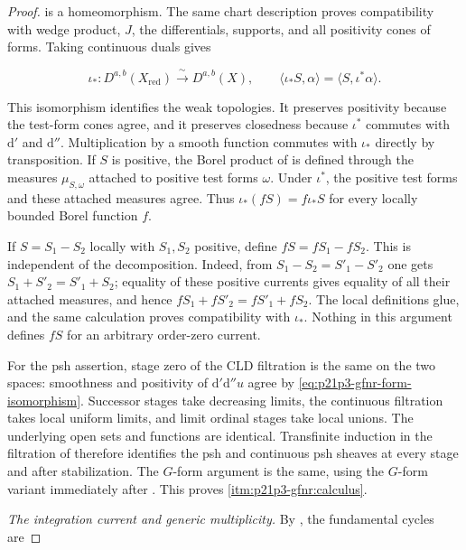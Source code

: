 \begin{proof}
is a homeomorphism.  The same chart description proves compatibility with
wedge product, \(J\), the differentials, supports, and all positivity cones
of forms.  Taking continuous duals gives

\begin{equation}
\label{eq:p21p3-gfnr-current-isomorphism}
 \iota_*:D^{a,b}(X_{\mathrm{red}})
              \xrightarrow{\ \sim\ }D^{a,b}(X),
 \qquad
 \langle\iota_*S,\alpha\rangle
       =\langle S,\iota^*\alpha\rangle .
\end{equation}

This isomorphism identifies the weak topologies.  It preserves positivity
because the test-form cones agree, and it preserves closedness because
\(\iota^*\) commutes with \(\mathrm d'\) and \(\mathrm d''\).
Multiplication by a smooth function commutes with \(\iota_*\) directly by
transposition.  If \(S\) is positive, the Borel product of
\cite[Example~7.2.12]{CLD25} is defined through the measures
\(\mu_{S,\omega}\) attached to positive test forms \(\omega\).  Under
\(\iota^*\), the positive test forms and these attached measures agree.
Thus \(\iota_*(fS)=f\iota_*S\) for every locally bounded Borel function
\(f\).

If \(S=S_1-S_2\) locally with \(S_1,S_2\) positive, define
\(fS=fS_1-fS_2\).  This is independent of the decomposition.  Indeed, from
\(S_1-S_2=S'_1-S'_2\) one gets
\(S_1+S'_2=S'_1+S_2\); equality of these positive currents gives equality
of all their attached measures, and hence
\(fS_1+fS'_2=fS'_1+fS_2\).  The local definitions glue, and the same
calculation proves compatibility with \(\iota_*\).  Nothing in this
argument defines \(fS\) for an arbitrary order-zero current.

For the psh assertion, stage zero of the CLD filtration is the same on the
two spaces: smoothness and positivity of
\(\mathrm d'\mathrm d''u\) agree by
\eqref{eq:p21p3-gfnr-form-isomorphism}.  Successor stages take decreasing
limits, the continuous filtration takes local uniform limits, and limit
ordinal stages take local unions.  The underlying open sets and functions
are identical.  Transfinite induction in the filtration of
\cite[Lemma~8.1.4 and Proposition~8.1.11]{CLD25} therefore identifies the
psh and continuous psh sheaves at every stage and after stabilization.  The
\(G\)-form argument is the same, using the \(G\)-form variant immediately after
\cite[Proposition~15.1.3]{CLD25}.  This proves
\cref{itm:p21p3-gfnr:calculus}.

\smallskip
\emph{The integration current and generic multiplicity.}
By \cite[Definition~13.2.5 and \S13.5.2]{CLD25}, the fundamental cycles
are


\end{proof}

